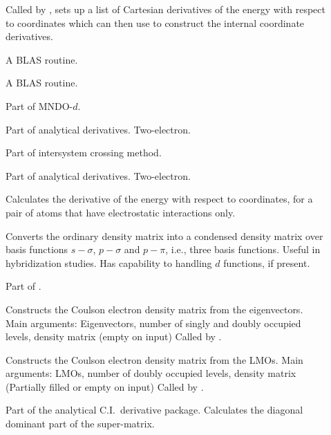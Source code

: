 \begin{description}
\item[] Called by ,   sets up a list
of Cartesian derivatives of the energy with respect to coordinates  which
 can then use to construct the internal coordinate derivatives.

\item[] A BLAS routine. 

\item[] A BLAS routine.

\item[] Part of MNDO-$d$.

\item[] Part of analytical derivatives. Two-electron.

\item[] Part of intersystem crossing method.

\item[] Part of analytical derivatives. Two-electron.

\item[] Calculates the derivative of the energy with respect to
coordinates, for a pair of atoms that have electrostatic interactions only.

\item[] Converts the ordinary density matrix into  a
condensed density matrix over basis functions $s-\sigma$,  $p-\sigma$ and
$p-\pi$, i.e., three basis functions. Useful  in hybridization studies. Has
capability to handling $d$  functions, if present.

\item[] Part of .

\item[] Constructs the Coulson electron density matrix from the
eigenvectors. Main arguments: Eigenvectors, number of singly and doubly
occupied levels, density matrix (empty on input) Called by .

\item[] Constructs the Coulson electron density matrix from the
LMOs. Main arguments: LMOs, number of doubly occupied levels,  density matrix
(Partially filled or empty on input) Called by .

\item[] Part of the analytical C.I.\ derivative package. 
Calculates the diagonal dominant part of the super-matrix.


\end{description}
